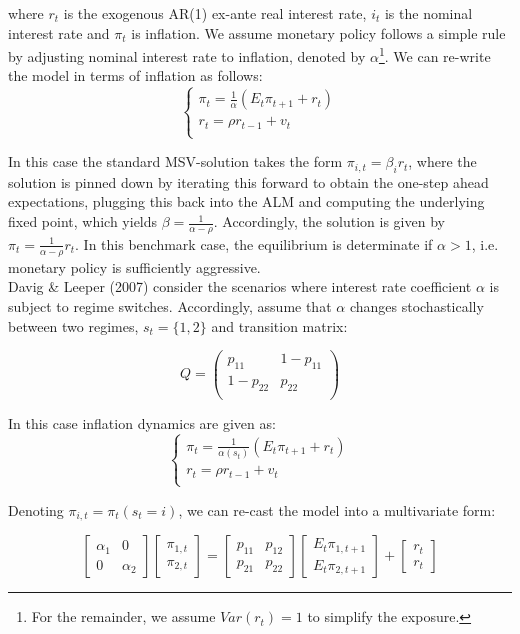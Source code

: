 \documentclass[12pt,reqno]{article}
\numberwithin{equation}{section}
\begin{document}
where $ r_t $ is the exogenous AR(1) ex-ante real interest rate, $ i_t $ is the nominal interest rate and $\pi_t $ is inflation. We assume monetary policy follows a simple rule by adjusting nominal interest rate to inflation, denoted by $\alpha$\footnote{For the remainder, we assume $Var(r_t)=1$ to simplify the exposure.}. We can re-write the model in terms of inflation as follows: \\

$$
\begin{cases}
\pi_t = \frac{1}{\alpha}(E_t \pi_{t+1} + r_t) \\
r_t = \rho r_{t-1} + v_t \\
\end{cases}
$$


In this case the standard MSV-solution takes the form $ \pi_{i,t} = \beta_i r_t $, where the solution is pinned down by iterating this forward to obtain the one-step ahead expectations, plugging this back into the ALM and computing the underlying fixed point, which yields $\beta= \frac{1}{\alpha-\rho}$. Accordingly, the solution is given by $\pi_t= \frac{1}{\alpha-\rho} r_t $. In this benchmark case, the equilibrium is determinate if $\alpha>1 $, i.e. monetary policy is sufficiently aggressive.\\
 Davig \& Leeper (2007) consider the scenarios where interest rate coefficient $\alpha$ is subject to regime switches. Accordingly, assume that $\alpha$ changes stochastically between two regimes, $s_t = \{1,2 \} $ and transition matrix:

$$
Q=\begin{pmatrix}
p_{11} & 1-p_{11} \\
1-p_{22} & p_{22} \\
\end{pmatrix}
$$

In this case inflation dynamics are given as: \\

$$
\begin{cases}
\pi_t = \frac{1}{\alpha(s_t)}(E_t \pi_{t+1} + r_t) \\
r_t = \rho r_{t-1} + v_t \\
\end{cases}
$$

Denoting $\pi_{i,t} = \pi_t (s_t=i)$, we can re-cast the model into a multivariate form:

$$
\begin{bmatrix} \alpha_1 & 0 \\ 0 & \alpha_2 \end{bmatrix} \begin{bmatrix} \pi_{1,t}  \\ \pi_{2,t}  \end{bmatrix} = \begin{bmatrix} p_{11} & p_{12} \\ p_{21} & p_{22} \end{bmatrix} \begin{bmatrix} E_t \pi_{1,t+1} \\ E_t \pi_{2,t+1} \end{bmatrix} + \begin{bmatrix}r_t \\ r_t \end{bmatrix}
$$
\end{document}
